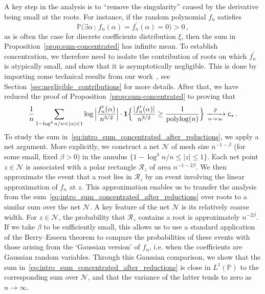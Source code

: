 \documentclass[11pt]{amsart}
\theoremstyle{remark}
\theoremstyle{definition}
\newcommand{\bP}{\mathbb P}
\newcommand{\cN}{\mathcal N}
\newcommand{\polylog}{\mathrm{polylog}}
\newcommand{\one}{\boldsymbol{1}}
\begin{document}
     A key step in the analysis is to “remove the singularity” caused by the derivative being small at the roots. For instance, if the random polynomial $f_n$ satisfies
    \[
    \bP\big(\exists \alpha \, ; \, f_n(\alpha) = f_n^\prime(\alpha) = 0 \big) >0 \, ,
    \]
    as is often the case for discrete coefficients distribution $\xi$, then the sum in Proposition~\ref{prop:sum-concentrated} has infinite mean. To establish concentration, we therefore need to isolate the contribution of roots on which  $f_n^\prime$ is atypically small, and show that it is asymptotically negligible. This is done by importing some technical results from our work~\cite{Michelen-Yakir-root-separation}, see Section~\ref{sec:negligible_contributions} for more details. After that, we have reduced the proof of Proposition~\ref{prop:sum-concentrated} to proving that 
    \begin{equation}
        \label{eq:intro_sum_concentrated_after_reductions}
        \frac{1}{n} \sum_{1- \log^3 n / n < |\alpha| < 1} \log \Big| \frac{f_n'(\alpha)}{n^{3/2}}\Big| \cdot 
        \one\Big\{\frac{|f_n^\prime(\alpha)|}{n^{3/2}}\ge \frac1{\polylog(n)}\Big\} \xrightarrow[n\to \infty]{\bP} {\sf c}_\ast \, .
    \end{equation}
    To study the sum in~\eqref{eq:intro_sum_concentrated_after_reductions}, we apply a net argument. More explicitly, we construct a net $\mathcal{N}$ of mesh size $n^{-1-\beta}$ (for some small, fixed $\beta > 0$) in the annulus $\{1 - \log^3 n / n \le |z| \le 1\}$. Each net point $z \in \mathcal{N}$ is associated with a polar rectangle $\mathcal{R}_z$ of area $n^{-1 - 2\beta}$. We then approximate the event that a root lies in $\mathcal{R}_z$ by an event involving the linear approximation of $f_n$ at $z$. This approximation enables us to transfer the analysis from the sum~\eqref{eq:intro_sum_concentrated_after_reductions} over roots to a similar sum over the net $\cN$. A key feature of the net $\mathcal{N}$ is its relatively coarse width. For $z\in \cN$, the probability that $\mathcal{R}_z$ contains a root is approximately $n^{-2\beta}$. If we take $\beta$ to be sufficiently small, this allows us to use a standard application of the Berry–Esseen theorem to compare the probabilities of these events with those arising from the `Gaussian version' of $f_n$, i.e. when the coefficients are Gaussian random variables. Through this Gaussian comparison, we show that the sum in~\eqref{eq:intro_sum_concentrated_after_reductions} is close in $L^1(\bP)$ to the corresponding sum over $\cN$, and that the variance of the latter tends to zero as $n \to \infty$. 
    
\end{document}
